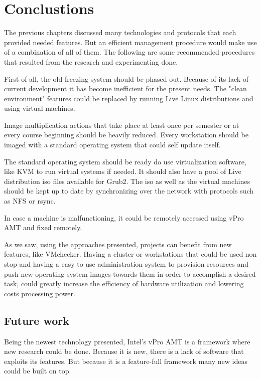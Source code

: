 
\chapter{Conclustions}\label{ch:conclusions}
\bigskip


The previous chapters discussed many technologies and
protocols that each provided needed features. But an efficient
management procedure would make use of a combination of all of them.
The following are some recommended procedures that resulted from the
research and experimenting done.

First of all, the old freezing system should be phased out. Because of
its lack of current development it has become inefficient for the
present needs. The "clean environment" features could be replaced by
running Live Linux distributions and using virtual machines.

Image multiplication actions that take place at least once per semester
or at every course beginning should be heavily reduced. Every
workstation should be imaged with a standard operating system that could
self update itself.

The standard operating system should be ready do use virtualization
software, like \ac{KVM} to run virtual systems if needed. It should also
have a pool of Live distribution iso files available for Grub2. The iso
as well as the virtual machines should be kept up to date by
synchronizing over the network with protocols such as \ac{NFS} or rsync.

In case a machine is malfunctioning, it could be remotely accessed using
vPro AMT and fixed remotely.

As we saw, using the approaches presented, projects can benefit from new
features, like VMchecker. Having a cluster or workstations that could be
used non stop and having a easy to use administration system to
provision resources and push new operating system images towards them in
order to accomplish a desired task, could greatly increase the efficiency
of hardware utilization and lowering costs processing power.


\section{Future work}

Being the newest technology presented, Intel's vPro AMT is a framework
where new research could be done. Because it is new, there is a lack of
software that exploits its features. But because it is a feature-full
framework many new ideas could be built on top.

